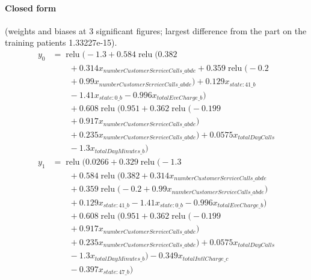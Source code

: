 \documentclass[a4paper,10pt]{article}
\newif\ifreviewmarks
\newcommand{\reviewrule}{\noindent{\color{BrickRed}\rule{\linewidth}{0.8pt}}}
\newenvironment{drafted}[1][]{%
  \ifreviewmarks\par\addvspace{\medskipamount}\reviewrule\par\nopagebreak
  \noindent{\color{BrickRed}\sffamily\footnotesize\textbf{Thesis Draft}\quad #1\hfill review}\par\nopagebreak\smallskip\fi}{%
  \ifreviewmarks\par\smallskip\noindent{\color{BrickRed}\sffamily\footnotesize end of thesis draft}\par\nopagebreak\reviewrule\par\medskip\fi}
\begin{document}
\begin{drafted}[plain-language layer: churn100-s2-c2]
\paragraph{Closed form} {\footnotesize(weights and biases at 3 significant figures; largest difference from the part on the training patients 1.33227e-15).}
{\small\begingroup\allowdisplaybreaks
\begin{align*}
y_{0} &= \operatorname{relu}\bigl(-1.3 + 0.584 \operatorname{relu}\bigl(0.382 \\
&\qquad + 0.314 x_{numberCustomerServiceCalls\_abde} + 0.359 \operatorname{relu}\bigl(-0.2 \\
&\qquad + 0.99 x_{numberCustomerServiceCalls\_abde}\bigr) + 0.129 x_{state:41\_b} \\
&\qquad - 1.41 x_{state:0\_b} - 0.996 x_{totalEveCharge\_b}\bigr) \\
&\qquad + 0.608 \operatorname{relu}\bigl(0.951 + 0.362 \operatorname{relu}\bigl(-0.199 \\
&\qquad + 0.917 x_{numberCustomerServiceCalls\_abde}\bigr) \\
&\qquad + 0.235 x_{numberCustomerServiceCalls\_abde}\bigr) + 0.0575 x_{totalDayCalls} \\
&\qquad - 1.3 x_{totalDayMinutes\_b}\bigr) \\
y_{1} &= \operatorname{relu}\bigl(0.0266 + 0.329 \operatorname{relu}\bigl(-1.3 \\
&\qquad + 0.584 \operatorname{relu}\bigl(0.382 + 0.314 x_{numberCustomerServiceCalls\_abde} \\
&\qquad + 0.359 \operatorname{relu}\bigl(-0.2 + 0.99 x_{numberCustomerServiceCalls\_abde}\bigr) \\
&\qquad + 0.129 x_{state:41\_b} - 1.41 x_{state:0\_b} - 0.996 x_{totalEveCharge\_b}\bigr) \\
&\qquad + 0.608 \operatorname{relu}\bigl(0.951 + 0.362 \operatorname{relu}\bigl(-0.199 \\
&\qquad + 0.917 x_{numberCustomerServiceCalls\_abde}\bigr) \\
&\qquad + 0.235 x_{numberCustomerServiceCalls\_abde}\bigr) + 0.0575 x_{totalDayCalls} \\
&\qquad - 1.3 x_{totalDayMinutes\_b}\bigr) - 0.349 x_{totalIntlCharge\_c} \\
&\qquad - 0.397 x_{state:47\_b}\bigr)
\end{align*}\endgroup}


\end{drafted}
\end{document}
